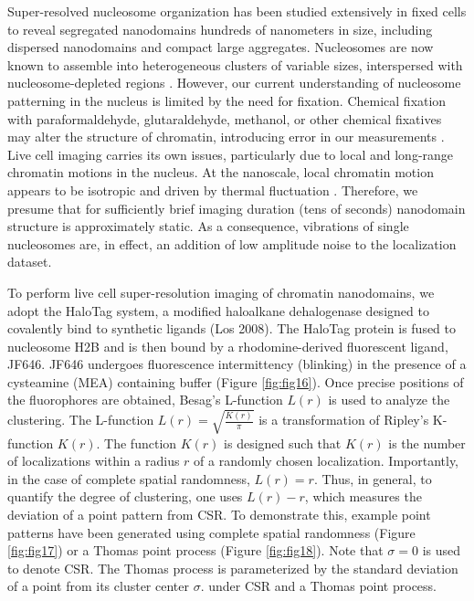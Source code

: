 Super-resolved nucleosome organization has been studied extensively in fixed cells to reveal segregated
nanodomains hundreds of nanometers in size, including dispersed nanodomains and compact large aggregates. Nucleosomes are now known to assemble into heterogeneous clusters of variable sizes, interspersed with nucleosome-depleted regions \parencite{Ricci2015}. However, our current understanding of nucleosome patterning in the nucleus is limited by the need for fixation. Chemical fixation with paraformaldehyde, glutaraldehyde, methanol, or other chemical fixatives may alter the structure of chromatin, introducing error in our measurements \parencite{Maeshima2020}. Live cell imaging carries its own issues, particularly due to local and long-range chromatin motions in the nucleus. At the nanoscale, local chromatin motion appears to be isotropic and driven by thermal fluctuation \parencite{Maeshima2020}. Therefore, we presume that for sufficiently brief imaging duration (tens of seconds) nanodomain structure is approximately static. As a consequence, vibrations of single nucleosomes are, in effect, an addition of low amplitude noise to the localization dataset. 

To perform live cell super-resolution imaging of chromatin nanodomains, we adopt the HaloTag system, a modified haloalkane dehalogenase designed to covalently bind to synthetic ligands (Los 2008). The HaloTag protein is fused to nucleosome H2B and is then bound by a rhodomine-derived fluorescent ligand, JF646. JF646 undergoes fluorescence intermittency (blinking) in the presence of a cysteamine (MEA) containing buffer (Figure \ref{fig:fig16}). Once precise positions of the fluorophores are obtained, Besag’s L-function $L(r)$ is used to analyze the clustering. The L-function $L(r)= \sqrt{\frac{K(r)}{\pi}}$ is a transformation of Ripley’s K-function $K(r)$. The function $K(r)$ is designed such that $K(r)$ is the number of localizations within a radius $r$ of a randomly chosen localization. Importantly, in the case of complete spatial randomness, $L(r)=r$. Thus, in general, to quantify the degree of clustering, one uses $L(r)-r$, which measures the deviation of a point pattern from CSR. To demonstrate this, example point patterns have been generated using complete spatial randomness (Figure \ref{fig:fig17}) or a Thomas point process (Figure \ref{fig:fig18}). Note that $\sigma=0$ is used to denote CSR. The Thomas process is parameterized by the standard deviation of a point from its cluster center $\sigma$. under CSR  and a Thomas point process. 


